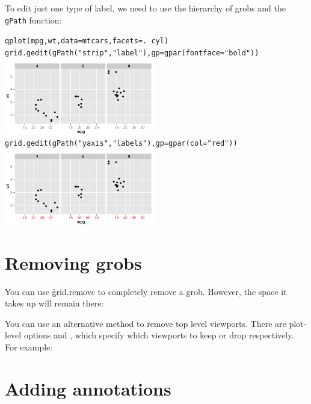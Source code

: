 To edit just one type of label, we need to use the hierarchy of grobs and the {\tt gPath} function:

\begin{alltt}
qplot(mpg, wt, data=mtcars, facets = . ~ cyl)
grid.gedit(gPath("strip","label"), gp=gpar(fontface="bold"))
\includegraphics[width=0.5\textwidth]{grid3}
grid.gedit(gPath("yaxis", "labels"), gp=gpar(col="red"))
\includegraphics[width=0.5\textwidth]{grid4}
\end{alltt}

\section{Removing grobs}
\label{sec:grid-delete}

You can use \f{grid.remove} to completely remove a grob.  However, the space it takes up will remain there:

% 

You can use an alternative method to remove top level viewports.  There are plot-level options  and , which specify which viewports to keep or drop respectively.  For example:

% 

\section{Adding annotations}\label{sec:adding_annotation}
\label{sec:grid-new}

